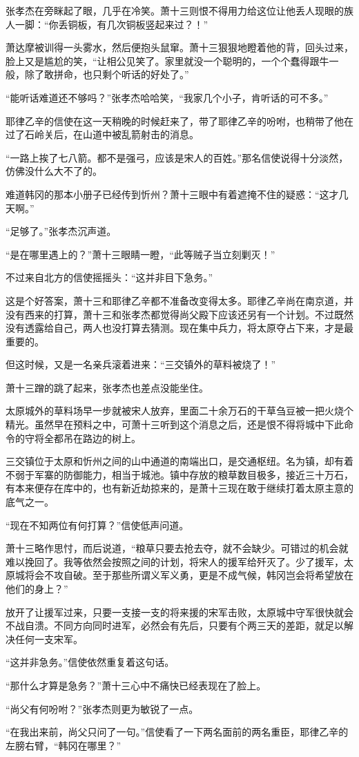 张孝杰在旁眯起了眼，几乎在冷笑。萧十三则恨不得用力给这位让他丢人现眼的族人一脚：“你丢铜板，有几次铜板竖起来过？！”

萧达摩被训得一头雾水，然后便抱头鼠窜。萧十三狠狠地瞪着他的背，回头过来，脸上又是尴尬的笑，“让相公见笑了。家里就没一个聪明的，一个个蠢得跟牛一般，除了敢拼命，也只剩个听话的好处了。”

“能听话难道还不够吗？”张孝杰哈哈笑，“我家几个小子，肯听话的可不多。”

耶律乙辛的信使在这一天稍晚的时候赶来了，带了耶律乙辛的吩咐，也稍带了他在过了石岭关后，在山道中被乱箭射击的消息。

“一路上挨了七八箭。都不是强弓，应该是宋人的百姓。”那名信使说得十分淡然，仿佛没什么大不了的。

难道韩冈的那本小册子已经传到忻州？萧十三眼中有着遮掩不住的疑惑：“这才几天啊。”

“足够了。”张孝杰沉声道。

“是在哪里遇上的？”萧十三眼睛一瞪，“此等贼子当立刻剿灭！”

不过来自北方的信使摇摇头：“这并非目下急务。”

这是个好答案，萧十三和耶律乙辛都不准备改变得太多。耶律乙辛尚在南京道，并没有西来的打算，萧十三和张孝杰都觉得尚父殿下应该还另有一个计划。不过既然没有透露给自己，两人也没打算去猜测。现在集中兵力，将太原夺占下来，才是最重要的。

但这时候，又是一名亲兵滚着进来：“三交镇外的草料被烧了！”

萧十三蹭的跳了起来，张孝杰也差点没能坐住。

太原城外的草料场早一步就被宋人放弃，里面二十余万石的干草刍豆被一把火烧个精光。虽然早在预料之中，可萧十三听到这个消息之后，还是恨不得将城中下此命令的守将全都吊在路边的树上。

三交镇位于太原和忻州之间的山中通道的南端出口，是交通枢纽。名为镇，却有着不弱于军寨的防御能力，相当于城池。镇中存放的粮草数目极多，接近三十万石，有本来便存在库中的，也有新近劫掠来的，是萧十三现在敢于继续打着太原主意的底气之一。

“现在不知两位有何打算？”信使低声问道。

萧十三略作思忖，而后说道，“粮草只要去抢去夺，就不会缺少。可错过的机会就难以挽回了。我等依然会按照之间的计划，将宋人的援军给歼灭了。少了援军，太原城将会不攻自破。至于那些所谓义军义勇，更是不成气候，韩冈岂会将希望放在他们的身上？”

放开了让援军过来，只要一支接一支的将来援的宋军击败，太原城中守军很快就会不战自溃。不同方向同时进军，必然会有先后，只要有个两三天的差距，就足以解决任何一支宋军。

“这并非急务。”信使依然重复着这句话。

“那什么才算是急务？”萧十三心中不痛快已经表现在了脸上。

“尚父有何吩咐？”张孝杰则更为敏锐了一点。

“在我出来前，尚父只问了一句。”信使看了一下两名面前的两名重臣，耶律乙辛的左膀右臂，“韩冈在哪里？”

